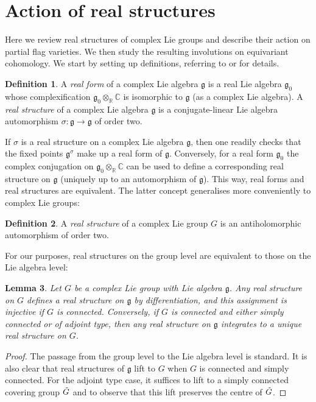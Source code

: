 \documentclass{amsart}
\newcommand{\C}{\mathbb{C}}
\newcommand{\g}{\mathfrak{g}}
\newcommand{\R}{\mathbb{R}}
\theoremstyle{definition}
\newtheorem{defn}{Definition}[section]
\theoremstyle{plain}
\newtheorem{lem}[defn]{Lemma}
\theoremstyle{remark}
\begin{document}
\section{Action of real structures}
\label{sec:real_str}
Here we review real structures of complex Lie groups and describe their action on partial flag varieties. We then study the resulting involutions on equivariant cohomology. We start by setting up definitions, referring to \cite[\S2--5]{Onishchik2004_real} or \cite[\S2]{GPRa2019_involutions} for details.
\begin{defn}
    A \emph{real form} of a complex Lie algebra $\g$ is a real Lie algebra $\g_0$ whose complexification $\g_0\otimes_\R \C$ is isomorphic to $\g$ (as a complex Lie algebra). 
    A \emph{real structure} of a complex Lie algebra $\g$ is a conjugate-linear Lie algebra automorphism $\sigma\colon \g\to \g$ of order two. 
\end{defn}
If $\sigma$ is a real structure on a complex Lie algebra $\g$, then one readily checks that the fixed points $\g^\sigma$ make up a real form of $\g$. Conversely, for a real form $\g_0$ the complex conjugation on $\g_0\otimes_\R \C$ can be used to define a corresponding real structure on $\g$ (uniquely up to an automorphism of $\g$). This way, real forms and real structures are equivalent. The latter concept generalises more conveniently to complex Lie groups: 
\begin{defn}
    A \emph{real structure} of a complex Lie group $G$ is an antiholomorphic automorphism of order two.
\end{defn}
For our purposes, real structures on the group level are equivalent to those on the Lie algebra level:
\begin{lem}
    Let $G$ be a complex Lie group with Lie algebra $\g$. Any real structure on $G$ defines a real structure on $\g$ by differentiation, and this assignment is injective if $G$ is connected. Conversely, if $G$ is connected and either simply connected or of adjoint type, then any real structure on $\g$ integrates to a unique real structure on $G$. 
\end{lem}
\begin{proof}
    The passage from the group level to the Lie algebra level is standard. It is also clear that real structures of $\g$ lift to $G$ when $G$ is connected and simply connected. For the adjoint type case, it suffices to lift to a simply connected covering group $\Tilde{G}$ and to observe that this lift preserves the centre of $\Tilde{G}$.
\end{proof}
\end{document}
